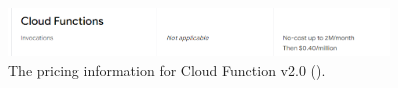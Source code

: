 \begin{figure}[htbp]
  \centering
  \includegraphics[width=0.9\textwidth]{Figures/Pricing.png}
  \caption{The pricing information for Cloud Function v2.0 (\textit{\cite{pricing}}).}
\end{figure}

\begin{multicols}{2}






\end{multicols}
